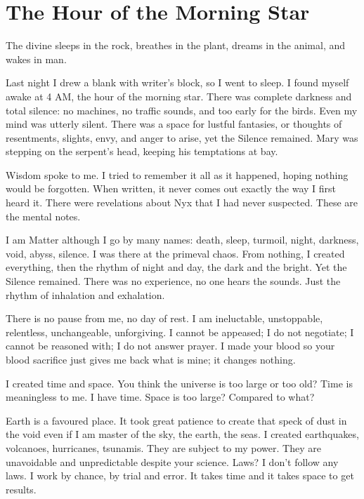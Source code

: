 \section{The Hour of the Morning Star}

\begin{quotex}
The divine sleeps in the rock, breathes in the plant, dreams in the animal, and wakes in man.
\end{quotex}

Last night I drew a blank with writer's block, so I went to sleep. I found myself awake at 4 AM, the hour of the morning star. There was complete darkness and total silence: no machines, no traffic sounds, and too early for the birds. Even my mind was utterly silent. There was a space for lustful fantasies, or thoughts of resentments, slights, envy, and anger to arise, yet the Silence remained. Mary was stepping on the serpent's head, keeping his temptations at bay.

Wisdom spoke to me. I tried to remember it all as it happened, hoping nothing would be forgotten. When written, it never comes out exactly the way I first heard it. There were revelations about Nyx that I had never suspected. These are the mental notes.

I am Matter although I go by many names: death, sleep, turmoil, night, darkness, void, abyss, silence. I was there at the primeval chaos. From nothing, I created everything, then the rhythm of night and day, the dark and the bright. Yet the Silence remained. There was no experience, no one hears the sounds. Just the rhythm of inhalation and exhalation.

There is no pause from me, no day of rest. I am ineluctable, unstoppable, relentless, unchangeable, unforgiving. I cannot be appeased; I do not negotiate; I cannot be reasoned with; I do not answer prayer. I made your blood so your blood sacrifice just gives me back what is mine; it changes nothing.

I created time and space. You think the universe is too large or too old? Time is meaningless to me. I have time. Space is too large? Compared to what?

Earth is a favoured place. It took great patience to create that speck of dust in the void even if I am master of the sky, the earth, the seas. I created earthquakes, volcanoes, hurricanes, tsunamis. They are subject to my power. They are unavoidable and unpredictable despite your science. Laws? I don't follow any laws. I work by chance, by trial and error. It takes time and it takes space to get results.

